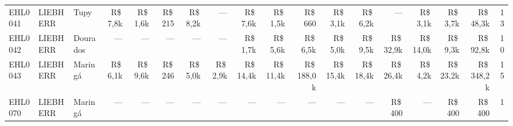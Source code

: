 \begin{landscape}
\begin{longtable}{@{}ll>{\raggedright\arraybackslash}p{2.2cm}rrrrrrrrrrrrrrr@{}}
EHL0041 & LIEBHERR & Tupy & R\$\,7,8k & R\$\,1,6k & R\$\,215 & R\$\,8,2k & --- & R\$\,7,6k & R\$\,1,5k & R\$\,660 & R\$\,3,1k & R\$\,6,2k & --- & R\$\,3,1k & R\$\,3,7k & R\$\,48,3k & 13 \\
EHL0042 & LIEBHERR & Dourados & --- & --- & --- & --- & --- & R\$\,1,7k & R\$\,5,6k & R\$\,6,5k & R\$\,5,0k & R\$\,9,5k & R\$\,32,9k & R\$\,14,0k & R\$\,9,3k & R\$\,92,8k & 10 \\
EHL0043 & LIEBHERR & Maringá & R\$\,6,1k & R\$\,9,6k & R\$\,246 & R\$\,5,0k & R\$\,2,9k & R\$\,14,4k & R\$\,11,4k & R\$\,188,0k & R\$\,15,4k & R\$\,18,4k & R\$\,26,4k & R\$\,4,2k & R\$\,23,2k & R\$\,348,2k & 15 \\
EHL0070 & LIEBHERR & Maringá & --- & --- & --- & --- & --- & --- & --- & --- & --- & --- & R\$\,400 & --- & R\$\,400 & R\$\,400 & 1 \\
\end{longtable}
\end{landscape}

